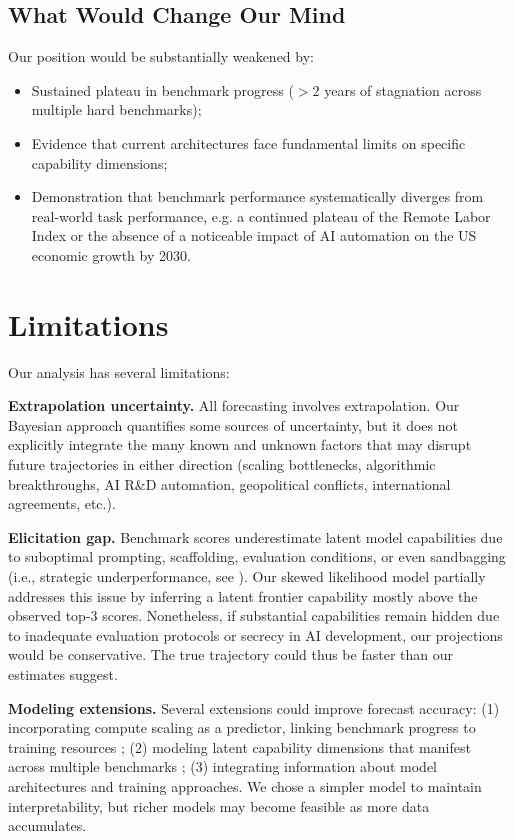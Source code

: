 \documentclass[letterpaper,twocolumn]{article}
\begin{document}
\subsection{What Would Change Our Mind}
\label{subsec:change_mind}

Our position would be substantially weakened by:
\begin{itemize}
    \item Sustained plateau in benchmark progress ($>2$ years of stagnation across multiple hard benchmarks);
    \item Evidence that current architectures face fundamental limits on specific capability dimensions;
    \item Demonstration that benchmark performance systematically diverges from real-world task performance, e.g. a continued plateau of the Remote Labor Index \citep{mazeika_remote_2025} or the absence of a noticeable impact of AI automation on the US economic growth by 2030.
\end{itemize}

\section{Limitations}
\label{sec:limitations}

Our analysis has several limitations:

\textbf{Extrapolation uncertainty.} All forecasting involves extrapolation.
Our Bayesian approach quantifies some sources of uncertainty, but it does not explicitly integrate the many known and unknown factors that may disrupt future trajectories in either direction (scaling bottlenecks, algorithmic breakthroughs, AI R\&D automation, geopolitical conflicts, international agreements, etc.).

\textbf{Elicitation gap.} Benchmark scores underestimate latent model capabilities due to suboptimal prompting, scaffolding, evaluation conditions, or even sandbagging (i.e., strategic underperformance, see \citet{weij_ai_2025}). Our skewed likelihood model partially addresses this issue by inferring a latent frontier capability mostly above the observed top-3 scores. Nonetheless, if substantial capabilities remain hidden due to inadequate evaluation protocols or secrecy in AI development, our projections would be conservative. The true trajectory could thus be faster than our estimates suggest.

\textbf{Modeling extensions.} Several extensions could improve forecast accuracy: (1) incorporating compute scaling as a predictor, linking benchmark progress to training resources \citep{kaplan_scaling_2020,ruan_observational_2024}; (2) modeling latent capability dimensions that manifest across multiple benchmarks \citep{burnell_revealing_2023, kipnis_metabench_2025, ho_rosetta_2025,polo_sloth_2025,pimpale_forecasting_2025}; (3) integrating information about model architectures and training approaches. We chose a simpler model to maintain interpretability, but richer models may become feasible as more data accumulates.
\end{document}
